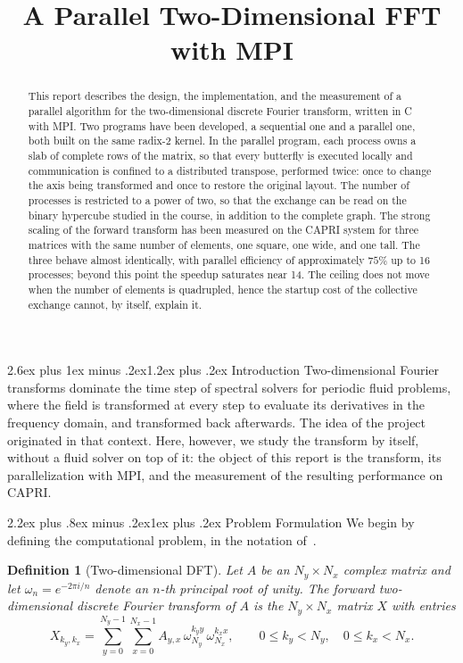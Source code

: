 \documentclass[conference,onecolumn]{IEEEtran}
\title{A Parallel Two-Dimensional FFT with MPI}
\author{\IEEEauthorblockN{Samuele Mega}
\IEEEauthorblockA{Parallel Computing Laboratory, University of Padova}}
\makeatletter
\renewcommand{\section}{\@startsection{section}{1}{\z@}%
  {2.6ex plus 1ex minus .2ex}{1.2ex plus .2ex}%
  {\normalfont\large\bfseries}}
\renewcommand{\subsection}{\@startsection{subsection}{2}{\z@}%
  {2.2ex plus .8ex minus .2ex}{1ex plus .2ex}%
  {\normalfont\normalsize\bfseries}}
\theoremstyle{course}
\newtheorem{definition}{Definition}
\makeatother
\begin{document}
\maketitle
\begin{abstract}
This report describes the design, the implementation, and the measurement
of a parallel algorithm for the two-dimensional discrete Fourier transform,
written in C with MPI. Two programs have been developed, a sequential one
and a parallel one, both built on the same radix-2 kernel. In the parallel
program, each process owns a slab of complete rows of the matrix, so that
every butterfly is executed locally and communication is confined to a
distributed transpose, performed twice: once to change the axis being
transformed and once to restore the original layout. The number of
processes is restricted to a power of two, so that the exchange can be read
on the binary hypercube studied in the course, in addition to the complete
graph. The strong scaling of the forward transform has been measured on the
CAPRI system for three matrices with the same number of elements, one
square, one wide, and one tall. The three behave almost identically, with
parallel efficiency of approximately $75\%$ up to 16 processes; beyond this
point the speedup saturates near 14. The ceiling does not move when the number of
elements is quadrupled, hence the startup cost of the collective exchange
cannot, by itself, explain it.
\end{abstract}

\section{Introduction}
Two-dimensional Fourier transforms dominate the time step of spectral
solvers for periodic fluid problems, where the field is transformed at every
step to evaluate its derivatives in the frequency domain, and transformed
back afterwards. The idea of the project originated in that context. Here,
however, we study the transform by itself, without a fluid solver on top of
it: the object of this report is the transform, its parallelization with
MPI, and the measurement of the resulting performance on CAPRI.

\subsection{Problem Formulation}
We begin by defining the computational problem, in the notation
of~\cite[ch.~6]{alg}.

\begin{definition}[Two-dimensional DFT]
Let $A$ be an $N_y\times N_x$ complex matrix and let $\omega_n=e^{-2\pi i/n}$
denote an $n$-th principal root of unity. The forward two-dimensional
discrete Fourier transform of $A$ is the $N_y\times N_x$ matrix $X$ with
entries
\begin{equation}
 X_{k_y,k_x}=\sum_{y=0}^{N_y-1}\sum_{x=0}^{N_x-1} A_{y,x}\,
 \omega_{N_y}^{k_y y}\,\omega_{N_x}^{k_x x},
 \qquad 0\le k_y<N_y,\quad 0\le k_x<N_x. \label{eq:dft2}
\end{equation}
\end{definition}
\end{document}
